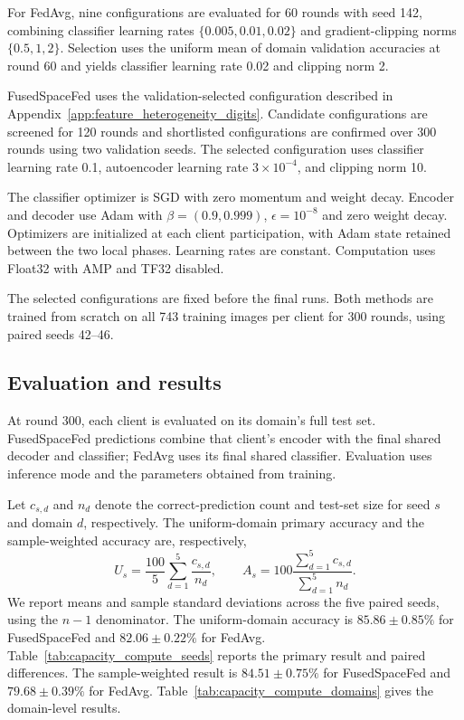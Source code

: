 For FedAvg, nine configurations are evaluated for 60 rounds with
seed 142, combining classifier learning rates
$\{0.005,0.01,0.02\}$ and gradient-clipping norms $\{0.5,1,2\}$.
Selection uses the uniform mean of domain validation accuracies at
round 60 and yields classifier learning rate 0.02 and clipping norm 2.

FusedSpaceFed uses the validation-selected configuration described in
Appendix~\ref{app:feature_heterogeneity_digits}. Candidate configurations
are screened for 120 rounds and shortlisted configurations are confirmed
over 300 rounds using two validation seeds. The selected configuration
uses classifier learning rate 0.1, autoencoder learning rate
$3\times10^{-4}$, and clipping norm 10.

The classifier optimizer is SGD with zero momentum and weight decay.
Encoder and decoder use Adam with $\beta=(0.9,0.999)$,
$\epsilon=10^{-8}$ and zero weight decay. Optimizers are initialized at
each client participation, with Adam state retained between the two
local phases. Learning rates are constant. Computation uses Float32
with AMP and TF32 disabled.

The selected configurations are fixed before the final runs.
Both methods are trained from scratch on all 743 training images per
client for 300 rounds, using paired seeds 42--46.

\subsection{Evaluation and results}

At round 300, each client is evaluated on its domain's full test set.
FusedSpaceFed predictions combine that client's encoder with the final
shared decoder and classifier; FedAvg uses its final shared classifier.
Evaluation uses inference mode and the parameters obtained from training.

Let $c_{s,d}$ and $n_d$ denote the correct-prediction count and test-set
size for seed $s$ and domain $d$, respectively. The uniform-domain
primary accuracy and the sample-weighted accuracy are, respectively,
\[
 U_s=\frac{100}{5}\sum_{d=1}^{5}\frac{c_{s,d}}{n_d},
 \qquad
 A_s=100\frac{\sum_{d=1}^{5}c_{s,d}}{\sum_{d=1}^{5}n_d}.
\]
We report means and sample standard deviations across the five paired
seeds, using the $n-1$ denominator. The uniform-domain accuracy is
$85.86\pm0.85\%$ for FusedSpaceFed and $82.06\pm0.22\%$ for FedAvg.
Table~\ref{tab:capacity_compute_seeds} reports the primary result and
paired differences. The sample-weighted result is $84.51\pm0.75\%$
for FusedSpaceFed and $79.68\pm0.39\%$ for FedAvg.
Table~\ref{tab:capacity_compute_domains} gives the domain-level results.

